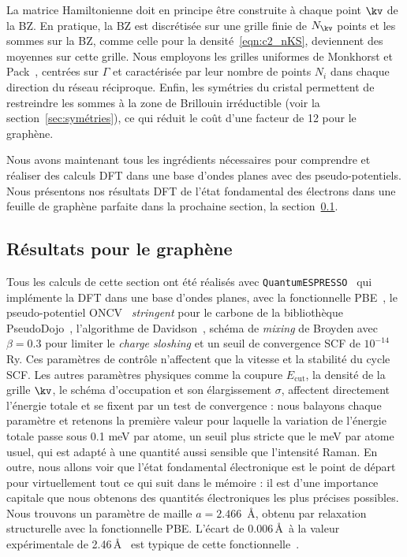 
La matrice Hamiltonienne doit en principe être construite à chaque point $\kv$ de la BZ. En pratique, la BZ est discrétisée sur une grille finie de $N_\kv$ points et les sommes sur la BZ, comme celle pour la densité~\eqref{eqn:c2_nKS}, deviennent des moyennes sur cette grille. Nous employons les grilles uniformes de Monkhorst et Pack~\cite{monkhorstSpecialPointsBrillouinzone1976}, centrées sur $\Gamma$ et caractérisée par leur nombre de points $N_i$ dans chaque direction du réseau réciproque. Enfin, les symétries du cristal permettent de restreindre les sommes à la zone de Brillouin irréductible (voir la section~\ref{sec:symétries}), ce qui réduit le coût d'une facteur de 12 pour le graphène.

Nous avons maintenant tous les ingrédients nécessaires pour comprendre et réaliser des calculs DFT dans une base d'ondes planes avec des pseudo-potentiels. Nous présentons nos résultats DFT de l'état fondamental des électrons dans une feuille de graphène parfaite dans la prochaine section, la section~\ref{sec:electron_results}.

\subsection{Résultats pour le graphène}\label{sec:electron_results}

Tous les calculs de cette section ont été réalisés avec \texttt{QuantumESPRESSO}~\cite{giannozziQUANTUMESPRESSOModular2009,giannozziAdvancedCapabilitiesMaterials2017,giannozziQuantumESPRESSOExascale2020} qui implémente la DFT dans une base d'ondes planes, avec la fonctionnelle PBE~\cite{perdewGeneralizedGradientApproximation1996a}, le pseudo-potentiel ONCV~\cite{hamannOptimizedNormconservingVanderbilt2013} \textit{stringent} pour le carbone de la bibliothèque PseudoDojo~\cite{vansettenPseudoDojoTrainingGrading2018}, l'algorithme de Davidson~\cite{davidsonIterativeCalculationFew1975}, schéma de \textit{mixing} de Broyden avec $\beta=0.3$ pour limiter le \textit{charge sloshing} et un seuil de convergence SCF de $10^{-14}$ Ry.  Ces paramètres de contrôle n'affectent que la vitesse et la stabilité du cycle SCF. Les autres paramètres physiques comme la coupure $E_\text{cut}$, la densité de la grille $\kv$, le schéma d'occupation et son élargissement $\sigma$, affectent directement l'énergie totale et se fixent par un test de convergence : nous balayons chaque paramètre et retenons la première valeur pour laquelle la variation de l'énergie totale passe sous 0.1 meV par atome, un seuil plus stricte que le meV par atome usuel, qui est adapté à une quantité aussi sensible que l'intensité Raman. En outre, nous allons voir que l'état fondamental électronique est le point de départ pour virtuellement tout ce qui suit dans le mémoire : il est d'une importance capitale que nous obtenons des quantités électroniques les plus précises possibles. Nous trouvons un paramètre de maille $a = 2.466$~\AA, obtenu par relaxation structurelle avec la fonctionnelle PBE. L'écart de 0.006\,\AA~à la valeur expérimentale de 2.46\,\AA~\cite{bosakElasticitySinglecrystallineGraphite2007a} est typique de cette fonctionnelle~\cite{mounetFirstprinciplesDeterminationStructural2005a}.


